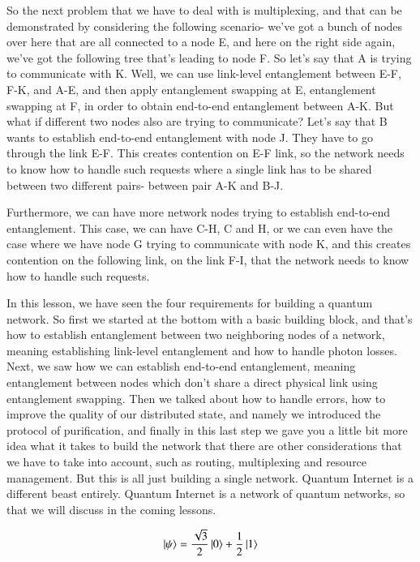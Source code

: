 So the next problem that we have to deal with is multiplexing, and that can be demonstrated by considering the following scenario- we've got a bunch of nodes over here that are all connected to a node E, and here on the right side again, we've got the following tree that's leading to node F. So let's say that A is trying to communicate with K. Well, we can use link-level entanglement between E-F, F-K, and A-E, and then apply entanglement swapping at E, entanglement swapping at F, in order to obtain end-to-end entanglement between A-K. But what if different two nodes also are trying to communicate? Let's say that B wants to establish end-to-end entanglement with node J. They have to go through the link E-F. This creates contention on E-F link, so the network needs to know how to handle such requests where a single link has to be shared between two different pairs- between pair A-K and B-J.

Furthermore, we can have more network nodes trying to establish end-to-end entanglement. This case, we can have C-H, C and H, or we can even have the case where we have node G trying to communicate with node K, and this creates contention on the following link, on the link F-I, that the network needs to know how to handle such requests.

In this lesson, we have seen the four requirements for building a quantum network. So first we started at the bottom with a basic building block, and that's how to establish entanglement between two neighboring nodes of a network, meaning establishing link-level entanglement and how to handle photon losses. Next, we saw how we can establish end-to-end entanglement, meaning entanglement between nodes which don't share a direct physical link using entanglement swapping. Then we talked about how to handle errors, how to improve the quality of our distributed state, and namely we introduced the protocol of purification, and finally in this last step we gave you a little bit more idea what it takes to build the network that there are other considerations that we have to take into account, such as routing, multiplexing and resource management. But this is all just building a single network. Quantum Internet is a different beast entirely. Quantum Internet is a network of quantum networks, so that we will discuss in the coming lessons.


\newpage
\begin{exercises}
\begin{equation*}
\ket{\psi} = \frac{\sqrt{3}}{2}\ket{0} + \frac{1}{2}\ket{1}
\end{equation*}


\end{exercises}

